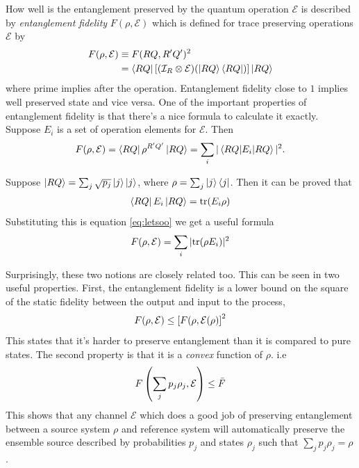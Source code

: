How well is the entanglement preserved by the quantum operation $\mathcal{E}$ is described by \textit{entanglement fidelity} $F(\rho, \mathcal{E})$ which is defined for trace preserving operations $\mathcal{E}$ by
\begin{align}
    F(\rho, \mathcal{E}) &\equiv F(RQ, R'Q')^2 \\
    &= \bra{RQ} \left[ (\mathcal{I}_R \otimes \mathcal{E}) (\ket{RQ}\bra{RQ}) \right] \ket{RQ}
\end{align}
where prime implies after the operation. Entanglement fidelity close to $1$ implies well preserved state and vice versa. One of the important properties of entanglement fidelity is that there's a nice formula to calculate it exactly. Suppose $E_i$ is a set of operation elements for $\mathcal{E}$. Then
\begin{align}
    F(\rho, \mathcal{E})  = \bra{RQ} \rho^{R'Q'} \ket{RQ} = \sum_i |\braket{RQ | E_i | RQ}|^2.
    \label{eq:letsoo}
\end{align}

Suppose $\ket{RQ} = \sum_j \sqrt{p_j}\ket{j}\ket{j}$, where $\rho = \sum_j \ket{j}\bra{j}$. Then it can be proved that
\begin{align}
    \bra{RQ} E_i \ket{RQ} = \text{tr}(E_i\rho)
\end{align}
Substituting this is equation \ref{eq:letsoo} we get a useful formula
\begin{equation}
    F(\rho, \mathcal{E}) = \sum_i | \text{tr}(\rho E_i) |^2
\end{equation}

Surprisingly, these two notions are closely related too. This can be seen in two useful properties. First, the entanglement fidelity is a lower bound on the square of the static fidelity between the output and input to the process,
\begin{equation}
    F(\rho, \mathcal{E}) \leq \left[ F(\rho, \operatorname{\mathcal{E}}(\rho) \right]^2
\end{equation}
This states that it's harder to preserve entanglement than it is compared to pure states. The second property is that it is a \textit{convex} function of $\rho$. i.e
\begin{equation}
    F\left( \sum_j p_j\rho_j, \mathcal{E} \right) \leq \Bar{F}
\end{equation}
This shows that any channel $\mathcal{E}$ which does a good job of preserving entanglement between a source system $\rho$ and reference system will automatically preserve  the ensemble source described by probabilities $p_j$ and states $\rho_j$ such that $\sum_j p_j\rho_j = \rho$.

